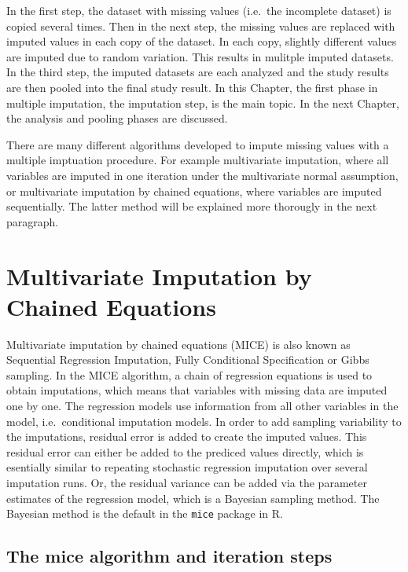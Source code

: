 \documentclass[]{book}
\begin{document}
In the first step, the dataset with missing values (i.e.~the incomplete
dataset) is copied several times. Then in the next step, the missing
values are replaced with imputed values in each copy of the dataset. In
each copy, slightly different values are imputed due to random
variation. This results in mulitple imputed datasets. In the third step,
the imputed datasets are each analyzed and the study results are then
pooled into the final study result. In this Chapter, the first phase in
multiple imputation, the imputation step, is the main topic. In the next
Chapter, the analysis and pooling phases are discussed.

There are many different algorithms developed to impute missing values
with a multiple imptuation procedure. For example multivariate
imputation, where all variables are imputed in one iteration under the
multivariate normal assumption, or multivariate imputation by chained
equations, where variables are imputed sequentially. The latter method
will be explained more thorougly in the next paragraph.

\section{Multivariate Imputation by Chained
Equations}\label{multivariate-imputation-by-chained-equations}

Multivariate imputation by chained equations (MICE) is also known as
Sequential Regression Imputation, Fully Conditional Specification or
Gibbs sampling. In the MICE algorithm, a chain of regression equations
is used to obtain imputations, which means that variables with missing
data are imputed one by one. The regression models use information from
all other variables in the model, i.e.~conditional imputation models. In
order to add sampling variability to the imputations, residual error is
added to create the imputed values. This residual error can either be
added to the prediced values directly, which is esentially similar to
repeating stochastic regression imputation over several imputation runs.
Or, the residual variance can be added via the parameter estimates of
the regression model, which is a Bayesian sampling method. The Bayesian
method is the default in the \texttt{mice} package in R.

\subsection{The mice algorithm and iteration
steps}\label{the-mice-algorithm-and-iteration-steps}
\end{document}
